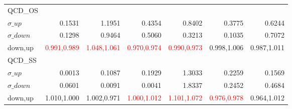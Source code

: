 \documentclass[11pt,oneside,a4paper]{article}
\begin{document}
\begin{table}
\begin{tabular}{lrrrrrr}
\hline
QCD\_OS &  &  &  &  &  &  \\
$\sigma\_up$ & 0.1531 & 1.1951 & 0.4354 & 0.8402 & 0.3775 & 0.6244 \\
$\sigma\_down$ & 0.1298 & 0.9464 & 0.5060 & 0.3213 & 0.1035 & 0.7072 \\
down,up & \textcolor{red}{0.991,0.989} & \textcolor{red}{1.048,1.061} & \textcolor{red}{0.970,0.974} & \textcolor{red}{0.990,0.973} & 0.998,1.006 & 0.987,1.011 \\

\hline
QCD\_SS &  &  &  &  &  &  \\
$\sigma\_up$ & 0.0013 & 0.1087 & 0.1929 & 1.3033 & 0.2259 & 0.1569 \\
$\sigma\_down$ & 0.0601 & 0.0091 & 0.0041 & 1.8337 & 0.2452 & 0.4684 \\
down,up & 1.010,1.000 & 1.002,0.971 & \textcolor{red}{1.000,1.012} & \textcolor{red}{1.101,1.072} & \textcolor{red}{0.976,0.978} & 0.964,1.012 \\

\hline
\end{tabular}
\end{table}
\end{document}
